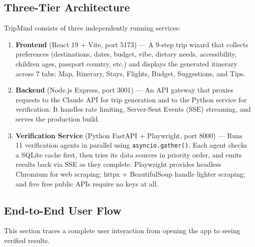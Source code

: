 \documentclass[11pt,a4paper]{article}
\begin{document}
\subsection{Three-Tier Architecture}

TripMind consists of three independently running services:

\begin{enumerate}
\item \textbf{Frontend} (React 19 + Vite, port 5173) --- A 9-step trip wizard that collects preferences (destinations, dates, budget, vibe, dietary needs, accessibility, children ages, passport country, etc.) and displays the generated itinerary across 7 tabs: Map, Itinerary, Stays, Flights, Budget, Suggestions, and Tips.

\item \textbf{Backend} (Node.js Express, port 3001) --- An API gateway that proxies requests to the Claude API for trip generation and to the Python service for verification. It handles rate limiting, Server-Sent Events (SSE) streaming, and serves the production build.

\item \textbf{Verification Service} (Python FastAPI + Playwright, port 8000) --- Runs 11 verification agents in parallel using \texttt{asyncio.gather()}. Each agent checks a SQLite cache first, then tries its data sources in priority order, and emits results back via SSE as they complete. Playwright provides headless Chromium for web scraping; httpx + BeautifulSoup handle lighter scraping; and five free public APIs require no keys at all.
\end{enumerate}

\subsection{End-to-End User Flow}

This section traces a complete user interaction from opening the app to seeing verified results.
\end{document}
